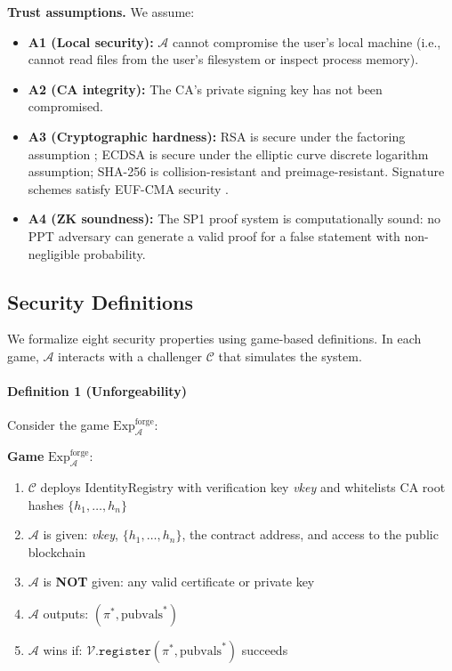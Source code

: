 \documentclass[11pt, a4paper]{article}
\providecommand{\tightlist}{%
  \setlength{\itemsep}{0pt}\setlength{\parskip}{0pt}}
\begin{document}
\textbf{Trust assumptions.} We assume:

\begin{itemize}
\tightlist
\item
  \textbf{A1 (Local security):} \(\mathcal{A}\) cannot compromise the
  user's local machine (i.e., cannot read files from the user's
  filesystem or inspect process memory).
\item
  \textbf{A2 (CA integrity):} The CA's private signing key has not been
  compromised.
\item
  \textbf{A3 (Cryptographic hardness):} RSA is secure under the
  factoring assumption \cite{ref12}; ECDSA is secure under the elliptic
  curve discrete logarithm assumption; SHA-256 is collision-resistant
  and preimage-resistant. Signature schemes satisfy EUF-CMA security
  \cite{ref24}.
\item
  \textbf{A4 (ZK soundness):} The SP1 proof system is computationally
  sound: no PPT adversary can generate a valid proof for a false
  statement with non-negligible probability.
\end{itemize}

\subsection{Security Definitions}\label{security-definitions}

We formalize eight security properties using game-based definitions. In
each game, \(\mathcal{A}\) interacts with a challenger \(\mathcal{C}\)
that simulates the system.

\paragraph{Definition 1
(Unforgeability)}\label{definition-1-unforgeability}

Consider the game \(\text{Exp}_{\mathcal{A}}^{\text{forge}}\):

\begin{mdframed}[linewidth=0.5pt, innertopmargin=6pt, innerbottommargin=6pt]
\small
\textbf{Game} $\text{Exp}_{\mathcal{A}}^{\text{forge}}$:
\begin{enumerate}[nosep,leftmargin=1.5em]
\item $\mathcal{C}$ deploys IdentityRegistry with verification key \textit{vkey} and whitelists CA root hashes $\{h_1, \ldots, h_n\}$
\item $\mathcal{A}$ is given: \textit{vkey}, $\{h_1, \ldots, h_n\}$, the contract address, and access to the public blockchain
\item $\mathcal{A}$ is \textbf{NOT} given: any valid certificate or private key
\item $\mathcal{A}$ outputs: $(\pi^*, \text{pubvals}^*)$
\item $\mathcal{A}$ wins if: $\mathcal{V}.\texttt{register}(\pi^*, \text{pubvals}^*)$ succeeds
\end{enumerate}
\end{mdframed}
\end{document}
